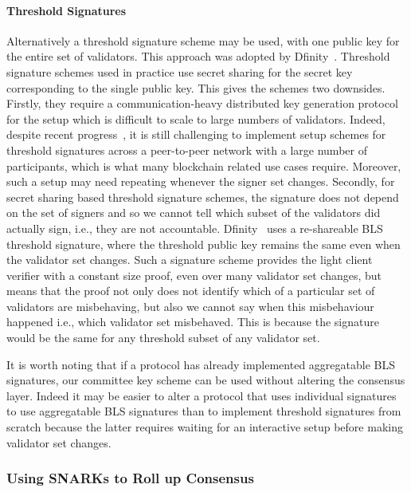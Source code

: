 \noindent \paragraph{Threshold Signatures} Alternatively a threshold signature scheme may be used, with one public key for the entire set of validators. This approach was adopted by Dfinity~\cite{GrothDKG}. Threshold signature schemes used in practice use secret sharing for the secret key corresponding to the single public key. This gives the schemes two downsides. Firstly, they require a communication-heavy distributed key generation protocol for the setup which is difficult to scale to large numbers of validators. Indeed, despite recent progress~\cite{AggregatableDKG,GrothDKG,LWEDKG}, it is still challenging to implement setup schemes for threshold signatures across a peer-to-peer network with a large number of participants, which is what many blockchain related use cases require. Moreover, such a setup may need repeating whenever the signer set changes. Secondly, for secret sharing based threshold signature schemes, the signature does not depend on the set of signers and so we cannot tell which subset of the validators did actually sign, i.e., they are not accountable. Dfinity~\cite{GrothDKG} uses a re-shareable BLS threshold signature, where the threshold public key remains the same even when the validator set changes. Such a signature scheme
provides the light client verifier with a constant size proof, even over many validator set changes, but means that the proof not only does not identify which of a particular set of validators are misbehaving, but also we cannot say when this misbehaviour happened i.e., which validator set misbehaved. This is because the signature would be the same for any threshold subset of any validator set.

\noindent It is worth noting that if a protocol has already implemented aggregatable BLS signatures, our committee key scheme can be used without altering the consensus layer. Indeed it may be easier to alter a protocol that uses individual
signatures to use aggregatable BLS signatures than to implement threshold signatures from scratch because the latter requires waiting for an interactive setup before making validator set changes.

\subsubsection{Using SNARKs to Roll up Consensus}

